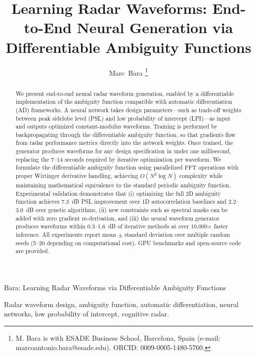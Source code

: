 \documentclass[journal]{IEEEtran}
\begin{document}
\title{Learning Radar Waveforms: End-to-End Neural Generation via Differentiable Ambiguity Functions}

\author{Marc~Bara%
\thanks{M. Bara is with ESADE Business School, Barcelona, Spain (e-mail: marcoantonio.bara@esade.edu). ORCID: 0009-0005-1480-5760.}%
}

%
{Bara: Learning Radar Waveforms via Differentiable Ambiguity Functions}

\maketitle

\begin{abstract}
We present end-to-end neural radar waveform generation, enabled by a differentiable implementation of the ambiguity function compatible with automatic differentiation (AD) frameworks.
A neural network takes design parameters---such as trade-off weights between peak sidelobe level (PSL) and low probability of intercept (LPI)---as input and outputs optimized constant-modulus waveforms.
Training is performed by backpropagating through the differentiable ambiguity function, so that gradients flow from radar performance metrics directly into the network weights.
Once trained, the generator produces waveforms for any design specification in under one millisecond, replacing the 7--14 seconds required by iterative optimization per waveform.
We formulate the differentiable ambiguity function using parallelized FFT operations with proper Wirtinger derivative handling, achieving $O(N^2 \log N)$ complexity while maintaining mathematical equivalence to the standard periodic ambiguity function.
Experimental validation demonstrates that (i) optimizing the full 2D ambiguity function achieves 7.3~dB PSL improvement over 1D autocorrelation baselines and 2.2--3.0~dB over genetic algorithms, (ii) new constraints such as spectral masks can be added with zero gradient re-derivation, and (iii) the neural waveform generator produces waveforms within 0.3--1.6~dB of iterative methods at over 10{,}000$\times$ faster inference.
All experiments report mean $\pm$ standard deviation over multiple random seeds (5--20 depending on computational cost).
GPU benchmarks and open-source code are provided.
\end{abstract}

\begin{IEEEkeywords}
Radar waveform design, ambiguity function, automatic differentiation, neural networks, low probability of intercept, cognitive radar.
\end{IEEEkeywords}
\end{document}
